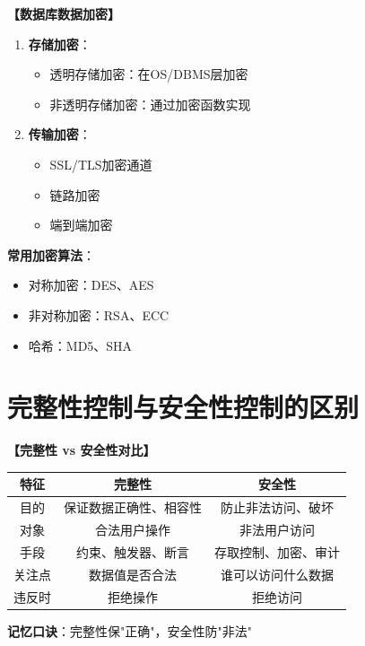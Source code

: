 \documentclass[12pt, a4paper]{article}
\newenvironment{bluebox}[1]{%
  \begin{trivlist}
  \item[\hskip\labelsep \textbf{#1}]
  \setlength{\parskip}{0.5ex}
  \setlength{\itemsep}{0.5ex}
}{%
  \end{trivlist}
}
\begin{document}
\begin{bluebox}{数据加密}
	\textbf{【数据库数据加密】}

	\begin{enumerate}[leftmargin=*, label=\textbf{\arabic*.}]
		\item \textbf{存储加密}：
		      \begin{itemize}
			      \item 透明存储加密：在OS/DBMS层加密
			      \item 非透明存储加密：通过加密函数实现
		      \end{itemize}
		\item \textbf{传输加密}：
		      \begin{itemize}
			      \item SSL/TLS加密通道
			      \item 链路加密
			      \item 端到端加密
		      \end{itemize}
	\end{enumerate}

	\textbf{常用加密算法}：
	\begin{itemize}
		\item 对称加密：DES、AES
		\item 非对称加密：RSA、ECC
		\item 哈希：MD5、SHA
	\end{itemize}
\end{bluebox}

\section{完整性控制与安全性控制的区别}

\begin{bluebox}{重要对比}
	\textbf{【完整性 vs 安全性对比】}

	\begin{tabular}{|c|c|c|}
		\hline
		\textbf{特征} & \textbf{完整性} & \textbf{安全性} \\
		\hline
		目的          & 保证数据正确性、相容性  & 防止非法访问、破坏    \\
		\hline
		对象          & 合法用户操作       & 非法用户访问       \\
		\hline
		手段          & 约束、触发器、断言    & 存取控制、加密、审计   \\
		\hline
		关注点         & 数据值是否合法      & 谁可以访问什么数据    \\
		\hline
		违反时         & 拒绝操作         & 拒绝访问         \\
		\hline
	\end{tabular}

	\textbf{记忆口诀}：完整性保"正确"，安全性防"非法"
\end{bluebox}
\end{document}
